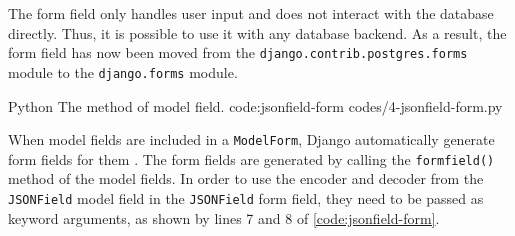 The form field only handles user input and does not interact with the database
directly. Thus, it is possible to use it with any database backend. As a
result, the form field has now been moved from the
\verb|django.contrib.postgres.forms| module to the \verb|django.forms| module.

\listing
{Python}
{The  method of  model field.}
{code:jsonfield-form}
{codes/4-jsonfield-form.py}

When model fields are included in a \verb|ModelForm|, Django automatically
generate form fields for them \cite{django:modelform}. The form fields are
generated by calling the \verb|formfield()| method of the model fields. In
order to use the encoder and decoder from the \verb|JSONField| model field in
the \verb|JSONField| form field, they need to be passed as keyword arguments,
as shown by lines 7 and 8 of \autoref{code:jsonfield-form}.
